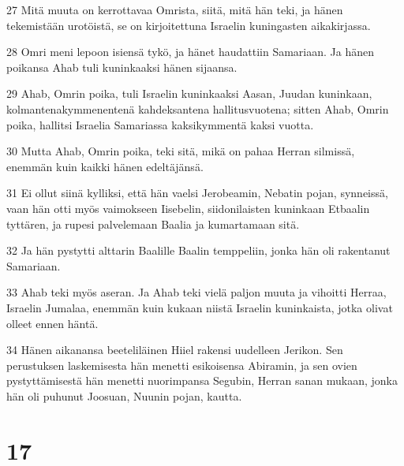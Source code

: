 \par 27 Mitä muuta on kerrottavaa Omrista, siitä, mitä hän teki, ja hänen tekemistään urotöistä, se on kirjoitettuna Israelin kuningasten aikakirjassa.
\par 28 Omri meni lepoon isiensä tykö, ja hänet haudattiin Samariaan. Ja hänen poikansa Ahab tuli kuninkaaksi hänen sijaansa.
\par 29 Ahab, Omrin poika, tuli Israelin kuninkaaksi Aasan, Juudan kuninkaan, kolmantenakymmenentenä kahdeksantena hallitusvuotena; sitten Ahab, Omrin poika, hallitsi Israelia Samariassa kaksikymmentä kaksi vuotta.
\par 30 Mutta Ahab, Omrin poika, teki sitä, mikä on pahaa Herran silmissä, enemmän kuin kaikki hänen edeltäjänsä.
\par 31 Ei ollut siinä kylliksi, että hän vaelsi Jerobeamin, Nebatin pojan, synneissä, vaan hän otti myös vaimokseen Iisebelin, siidonilaisten kuninkaan Etbaalin tyttären, ja rupesi palvelemaan Baalia ja kumartamaan sitä.
\par 32 Ja hän pystytti alttarin Baalille Baalin temppeliin, jonka hän oli rakentanut Samariaan.
\par 33 Ahab teki myös aseran. Ja Ahab teki vielä paljon muuta ja vihoitti Herraa, Israelin Jumalaa, enemmän kuin kukaan niistä Israelin kuninkaista, jotka olivat olleet ennen häntä.
\par 34 Hänen aikanansa beeteliläinen Hiiel rakensi uudelleen Jerikon. Sen perustuksen laskemisesta hän menetti esikoisensa Abiramin, ja sen ovien pystyttämisestä hän menetti nuorimpansa Segubin, Herran sanan mukaan, jonka hän oli puhunut Joosuan, Nuunin pojan, kautta.

\chapter{17}

